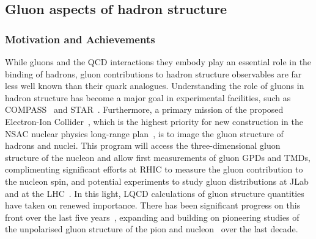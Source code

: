 \subsection{Gluon aspects of hadron structure}

%


\subsubsection{Motivation and Achievements}

While gluons and the QCD interactions they embody play an essential role in the binding of hadrons, gluon contributions to hadron structure observables are far less well known than their quark analogues. Understanding the role of gluons in hadron structure has become a major goal in experimental facilities, such as COMPASS~\cite{Adare:2014hsq} and STAR~\cite{Djawotho:2013pga}. Furthermore, a primary mission of the proposed Electron-Ion Collider~\cite{Accardi:2012qut,Kalantarians:2014eda}, which is the highest priority for new construction in the NSAC nuclear physics long-range plan~\cite{Geesaman:2015fha}, is to image the gluon structure of hadrons and nuclei. This program will access the three-dimensional gluon structure of the nucleon and allow first measurements of gluon GPDs and TMDs, complimenting significant efforts at RHIC to measure the gluon contribution to the nucleon spin, and potential experiments to study gluon distributions at JLab~\cite{Maxwell:2018gci,Hattawy:2017woc,Dobbs:2017vjw} and at the LHC~\cite{Baltz:2007kq}. 
%
In this light, LQCD calculations of gluon structure quantities have taken on renewed importance. There has been significant progress on this front over the last five years~\cite{Alexandrou:2017oeh,Yang:2016plb,Detmold:2016gpy,Detmold:2017oqb,Winter:2017bfs,Alexandrou:2016ekb}, expanding and building on pioneering studies of the unpolarised gluon structure of the pion and nucleon~\cite{Meyer:2007tm,Horsley:2012pz,Alexandrou:2013tfa,Deka:2013zha} over the last decade. 

